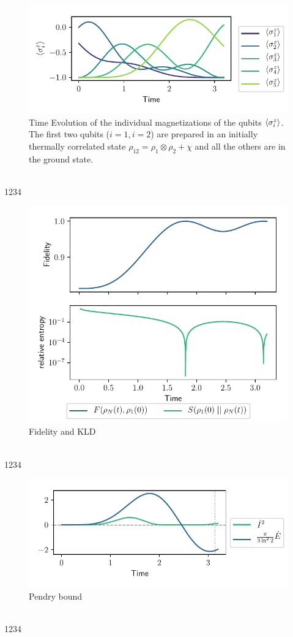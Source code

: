 \documentclass{book}
\numberwithin{equation}{section} %
\begin{document}
\begin{figure}[h!]
    \centering
    \includegraphics{alltheplots/diff_beta/beta1>beta2/12_expval_z.pdf}
    \caption{Time Evolution of the individual magnetizations of the qubits
    $\expval{\sigma^z_i}$.
    The first two qubits ($i=1, i=2$) are prepared in an initially thermally correlated state $\rho_{12} = \rho_1 \otimes \rho_2 + \chi$
    and all the others are in the ground state.}
    \label{fig:beta1_gt_beta2_corr12_expval_z}
\end{figure}\\
1234
\begin{figure}[h!]
    \centering
    \includegraphics{alltheplots/diff_beta/beta1>beta2/12_fidelity_kld.pdf}
    \caption{Fidelity and KLD}
    \label{fig:beta1_gt_beta2_corr12_fid_kld}
\end{figure}\\
1234
\begin{figure}[h!]
    \centering
    \includegraphics{alltheplots/diff_beta/beta1>beta2/12_pendry_grey_lines.pdf}
    \caption{Pendry bound \cite{BA_Pendry_1983}}
    \label{fig:beta1_gt_beta2_corr12_pendry}
\end{figure}\\
1234
\end{document}
